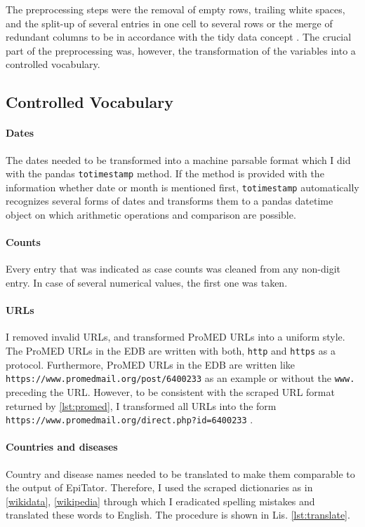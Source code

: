 The preprocessing steps were the removal of empty rows, trailing white spaces, and the split-up of several entries in one cell to several rows or the merge of redundant columns to be in accordance with the tidy data concept \citep{Wickham2014}.
The crucial part of the preprocessing was, however, the transformation of the variables into a controlled vocabulary.

\subsection{Controlled Vocabulary}
\paragraph{Dates}
The dates needed to be transformed into a machine parsable format which I did with the pandas \texttt{totimestamp} method. If the method is provided with the information whether date or month is mentioned first, \texttt{totimestamp} automatically recognizes several forms of dates and transforms them to a pandas datetime object on which arithmetic operations and comparison are possible.

\paragraph{Counts}
Every entry that was indicated as case counts was cleaned from any non-digit entry. In case of several numerical values, the first one was taken.

\paragraph{URLs}
I removed invalid URLs, and transformed ProMED URLs into a uniform style. The ProMED URLs in the EDB are written with both, \texttt{http} and \texttt{https} as a protocol. Furthermore, ProMED URLs in the EDB are written like \textquotesingle \texttt{https://www.promedmail.org/post/6400233} \textquotesingle as an example or without the \texttt{www.} preceding the URL. However, to be consistent with the scraped URL format returned by \ref{lst:promed}, I transformed all URLs into the form \textquotesingle \texttt{https://\allowbreak www.promedmail.org/\allowbreak direct.php?id=6400233} \textquotesingle.

\paragraph{Countries and diseases}
Country and disease names needed to be translated to make them comparable to the output of EpiTator. Therefore, I used the scraped dictionaries as in \ref{wikidata}, \ref{wikipedia} through which I eradicated spelling mistakes and translated these words to English. The procedure is shown in Lis. \ref{lst:translate}.

